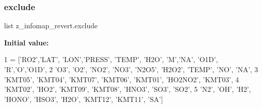 \subsubsection{\texorpdfstring{exclude}{exclude}}
{\footnotesize\ttfamily list z\+\_\+infomap\+\_\+revert.\+exclude}

{\bfseries Initial value\+:}
\begin{DoxyCode}
1 =  [\textcolor{stringliteral}{'RO2'},\textcolor{stringliteral}{'LAT'}, \textcolor{stringliteral}{'LON'},\textcolor{stringliteral}{'PRESS'}, \textcolor{stringliteral}{'TEMP'}, \textcolor{stringliteral}{'H2O'}, \textcolor{stringliteral}{'M'},\textcolor{stringliteral}{'NA'}, \textcolor{stringliteral}{'O1D'}, \textcolor{stringliteral}{'R','}O','O1D',
2  \textcolor{stringliteral}{'O3'}, \textcolor{stringliteral}{'O2'}, \textcolor{stringliteral}{'NO2'}, \textcolor{stringliteral}{'NO3'}, \textcolor{stringliteral}{'N2O5'}, \textcolor{stringliteral}{'H2O2'}, \textcolor{stringliteral}{'TEMP'}, \textcolor{stringliteral}{'NO'}, \textcolor{stringliteral}{'NA'},
3  \textcolor{stringliteral}{'KMT05'}, \textcolor{stringliteral}{'KMT04'}, \textcolor{stringliteral}{'KMT07'}, \textcolor{stringliteral}{'KMT06'}, \textcolor{stringliteral}{'KMT01'}, \textcolor{stringliteral}{'HO2NO2'}, \textcolor{stringliteral}{'KMT03'},
4   \textcolor{stringliteral}{'KMT02'}, \textcolor{stringliteral}{'HO2'}, \textcolor{stringliteral}{'KMT09'}, \textcolor{stringliteral}{'KMT08'}, \textcolor{stringliteral}{'HNO3'}, \textcolor{stringliteral}{'SO3'}, \textcolor{stringliteral}{'SO2'},
5   \textcolor{stringliteral}{'N2'}, \textcolor{stringliteral}{'OH'}, \textcolor{stringliteral}{'H2'}, \textcolor{stringliteral}{'HONO'}, \textcolor{stringliteral}{'HSO3'}, \textcolor{stringliteral}{'H2O'}, \textcolor{stringliteral}{'KMT12'}, \textcolor{stringliteral}{'KMT11'}, \textcolor{stringliteral}{'SA'}]
\end{DoxyCode}

